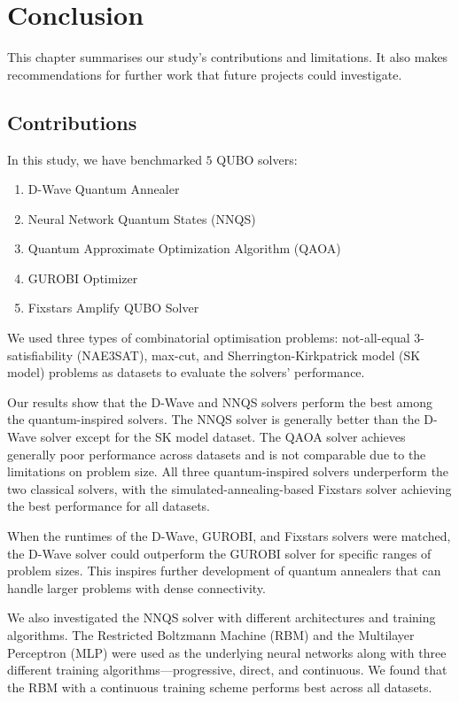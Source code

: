 \chapter{Conclusion}

This chapter summarises our study's contributions and limitations. It also makes recommendations for further work that future projects could investigate.

\section{Contributions}
In this study, we have benchmarked $5$ QUBO solvers:
\begin{enumerate}
    \item D-Wave Quantum Annealer
    \item Neural Network Quantum States (NNQS)
    \item Quantum Approximate Optimization Algorithm (QAOA)
    \item GUROBI Optimizer
    \item Fixstars Amplify QUBO Solver
\end{enumerate}
We used three types of combinatorial optimisation problems: not-all-equal 3-satisfiability (NAE3SAT), max-cut, and Sherrington-Kirkpatrick model (SK model) problems as datasets to evaluate the solvers' performance.

Our results show that the D-Wave and NNQS solvers perform the best among the quantum-inspired solvers. The NNQS solver is generally better than the D-Wave solver except for the SK model dataset. The QAOA solver achieves generally poor performance across datasets and is not comparable due to the limitations on problem size. All three quantum-inspired solvers underperform the two classical solvers, with the simulated-annealing-based Fixstars solver achieving the best performance for all datasets.

When the runtimes of the D-Wave, GUROBI, and Fixstars solvers were matched, the D-Wave solver could outperform the GUROBI solver for specific ranges of problem sizes. This inspires further development of quantum annealers that can handle larger problems with dense connectivity.

We also investigated the NNQS solver with different architectures and training algorithms. The Restricted Boltzmann Machine (RBM) and the Multilayer Perceptron (MLP) were used as the underlying neural networks along with three different training algorithms---progressive, direct, and continuous. We found that the RBM with a continuous training scheme performs best across all datasets.

